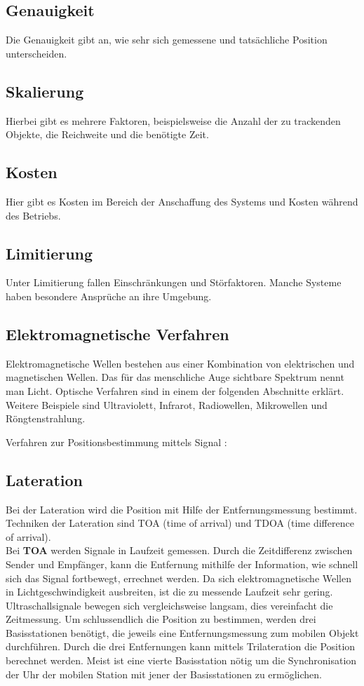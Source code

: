     \subsection*{Genauigkeit}
    Die Genauigkeit gibt an, wie sehr sich gemessene und tatsächliche Position unterscheiden.

    \subsection*{Skalierung}
    Hierbei gibt es mehrere Faktoren, beispielsweise die Anzahl der zu trackenden Objekte, die Reichweite und die benötigte Zeit.

    \subsection*{Kosten}
    Hier gibt es Kosten im Bereich der Anschaffung des Systems und Kosten während des Betriebs.

    \subsection*{Limitierung}
    Unter Limitierung fallen Einschränkungen und Störfaktoren. Manche Systeme haben besondere Ansprüche an ihre Umgebung.

    \subsection{Elektromagnetische Verfahren}
    Elektromagnetische Wellen bestehen aus einer Kombination von elektrischen und magnetischen Wellen. Das für das menschliche Auge sichtbare Spektrum nennt man Licht. Optische Verfahren sind in einem der folgenden Abschnitte erklärt. Weitere Beispiele sind Ultraviolett, Infrarot, Radiowellen, Mikrowellen und Röngtenstrahlung.

    Verfahren zur Positionsbestimmung mittels Signal\cite{pos_signal_2} \cite{pos_signal_4}: 

    \subsection*{Lateration}
    Bei der Lateration wird die Position mit Hilfe der Entfernungsmessung bestimmt.
    Techniken der Lateration sind TOA (time of arrival) und TDOA (time difference of arrival).\\
    Bei \textbf{TOA} werden Signale in Laufzeit gemessen. Durch die Zeitdifferenz zwischen Sender und Empfänger, kann die Entfernung mithilfe der Information, wie schnell sich das Signal fortbewegt, errechnet werden. Da sich elektromagnetische Wellen in Lichtgeschwindigkeit ausbreiten, ist die zu messende Laufzeit sehr gering. Ultraschallsignale bewegen sich vergleichsweise langsam, dies vereinfacht die Zeitmessung.
    Um schlussendlich die Position zu bestimmen, werden drei Basisstationen benötigt, die jeweils eine Entfernungsmessung zum mobilen Objekt durchführen. Durch die drei Entfernungen kann mittels Trilateration die Position berechnet werden. Meist ist eine vierte Basisstation nötig um die Synchronisation der Uhr der mobilen Station mit jener der Basisstationen zu ermöglichen.


